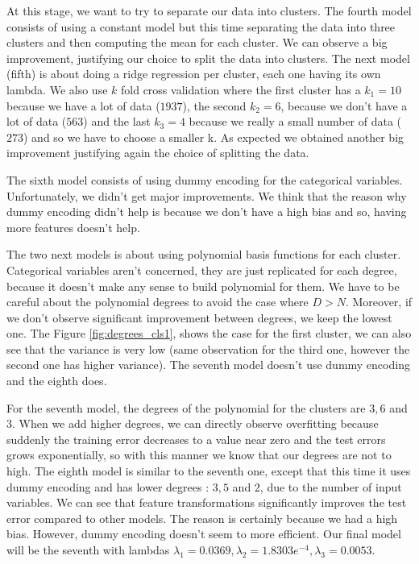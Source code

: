 \documentclass{article} %
\begin{document}
At this stage, we want to try to separate our data into clusters. The fourth model consists of using a constant model but this time separating the data into three clusters and then computing the mean for each cluster. We can observe a big improvement, justifying our choice to split the data into clusters. The next model (fifth) is about doing a ridge regression per cluster, each one having its own lambda. We also use $k$ fold cross validation where the first cluster has a $k_1=10$ because we have a lot of data ($1937$), the second $k_2=6$, because we don't have a lot of data ($563$) and the last $k_3=4$ because we really a small number of data ($273$) and so we have to choose a smaller k. As expected we obtained another big improvement justifying again the choice of splitting the data.

The sixth model consists of using dummy encoding for the categorical variables. Unfortunately, we didn't get major improvements. We think that the reason why dummy encoding didn't help is because we don't have a high bias and so, having more features doesn't help.

The two next models is about using polynomial basis functions for each cluster. Categorical variables aren't concerned, they are just replicated for each degree, because it doesn't make any sense to build polynomial for them.  We have to be careful about the polynomial degrees to avoid the case where $D > N$. Moreover, if we don't observe significant improvement between degrees, we keep the lowest one. The Figure \ref{fig:degrees_cls1}, shows the case for the first cluster, we can also see that the variance is very low (same observation for the third one, however the second one has higher variance). The seventh model doesn't use dummy encoding and the eighth does.

For the seventh model, the degrees of the polynomial for the clusters are $3,6$ and $3$. When we add higher degrees, we can directly observe overfitting because suddenly the training error decreases to a value near zero and the test errors grows exponentially, so with this manner we know that our degrees are not to high. The eighth model is similar to the seventh one, except that this time it uses dummy encoding and has lower degrees : $3,5$ and $2$, due to the number of input variables. We can see that feature transformations significantly improves the test error compared to other models. The reason is certainly because we had a high bias. However, dummy encoding doesn't seem to more efficient. Our final model will be the seventh with lambdas $\lambda_1 = 0.0369, \lambda_2 = 1.8303e^{-4}, \lambda_3 = 0.0053$.
\end{document}

